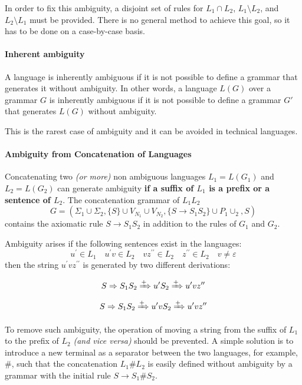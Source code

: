 \documentclass[english]{article}
\begin{document}
In order to fix this ambiguity, a disjoint set of rules for \(L_1 \cap L_2\), \(L_1 \setminus L_2\), and \(L_2 \setminus L_1\) must be provided.
There is no general method to achieve this goal, so it has to be done on a case-by-case basis.

\paragraph{Inherent ambiguity}

A language is inherently ambiguous if it is not possible to define a grammar that generates it without ambiguity.
In other words, a language \(L(G)\) over a grammar \(G\) is inherently ambiguous if it is not possible to define a grammar \(G'\) that generates \(L(G)\) without ambiguity.

This is the rarest case of ambiguity and it can be avoided in technical languages.

\paragraph{Ambiguity from Concatenation of Languages}

Concatenating two \textit{(or more)} non ambiguous languages \(L_1 = L(G_1)\) and \(L_2 = L(G_2)\) can generate ambiguity \textbf{if a suffix of \(L_1\) is a prefix or a sentence of \(L_2\)}.
The concatenation grammar  of \(L_1 L_2\)
\[G = \left(\Sigma_1 \cup \Sigma_2, \{S\} \cup V_{N_1} \cup V_{N_2}, \{S \rightarrow S_1 S_2\} \cup P_1 \cup _2, S\right)\]
contains the axiomatic rule \(S \rightarrow S_1 S_2\) in addition to the rules of \(G_1\) and \(G_2\).

Ambiguity arises if the following sentences exist in the languages:
\[ u^\prime \in L_1 \quad u^\prime v \in L_2 \quad v z^{\prime \prime} \in L_2 \quad z^{\prime \prime} \in L_2 \quad v \neq \varepsilon \]
then the string \(u^\prime v z^{\prime \prime}\) is generated by two different derivations:

\[S \Rightarrow S_1 S_2 \xRightarrow{+} u^\prime S_2 \xRightarrow{+} u^\prime v z^{\prime \prime}\]
\[S \Rightarrow S_1 S_2 \xRightarrow{+} u^\prime v S_2 \xRightarrow{+} u^\prime v z^{\prime \prime}\]

To remove such ambiguity, the operation of moving a string from the suffix of \(L_1\) to the prefix of \(L_2\) \textit{(and vice versa)} should be prevented.
A simple solution is to introduce a new terminal as a separator between the two languages, for example, \(\#\), such that the concatenation \(L_1 \# L_2\) is easily defined without ambiguity by a grammar with the initial rule \(S \rightarrow S_1 \# S_2\).
\end{document}

